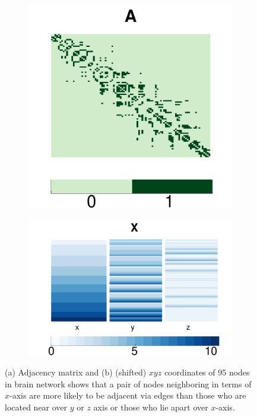 \documentclass[11pt]{article}
\theoremstyle{definition}
\begin{document}
	\begin{figure}[ht]
		\centering
		\begin{subfigure}[b]{0.39\textwidth}
			\includegraphics[width=\textwidth]{brainnet.pdf}
			\caption{}
			\label{fig:adj}
		\end{subfigure}
		\begin{subfigure}[b]{0.58\textwidth}
			\includegraphics[width=\textwidth]{attrimat.pdf}
			\caption{}
			\label{fig:attri}
		\end{subfigure}
		\caption{(a) Adjacency matrix and (b) (shifted) $xyz$ coordinates of 95 nodes in brain network shows that a pair of nodes neighboring in terms of $x$-axis are more likely to be adjacent via edges than those who are located near over $y$ or $z$ axis or those who lie apart over $x$-axis.}
		\label{fig:into}
	\end{figure}
	
\end{document}
